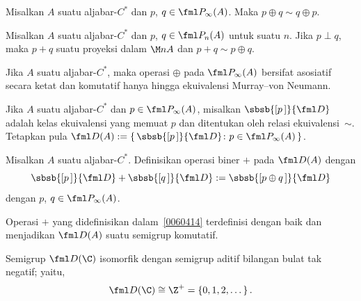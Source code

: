 \begin{prop}\label{0060331} Misalkan $A$ suatu aljabar-$C^*$ dan $p$, $q \in \fml P_\infty(A)$.
Maka $p \oplus q \sim q \oplus p$.
\end{prop}

\begin{prop}\label{0060334} Misalkan $A$ suatu aljabar-$C^*$ dan $p$, $q \in \fml P_n(A)$ untuk
suatu $n$. Jika $p \perp q$, maka $p + q$ suatu proyeksi dalam $\M nA$ dan $p + q \sim p \oplus q$.
\end{prop}

\begin{prop}\label{0060337} Jika $A$ suatu aljabar-$C^*$, maka operasi $\oplus$ pada $\fml P_\infty(A)$ bersifat
asosiatif secara ketat dan komutatif hanya hingga ekuivalensi Murray--von Neumann. %
\end{prop}

\begin{notn}\label{0060411} Jika $A$ suatu aljabar-$C^*$ dan $p \in \fml P_\infty(A)$, misalkan
$\sbsb{[p\,]}{\fml D}$ adalah kelas ekuivalensi yang memuat $p$ dan ditentukan oleh
relasi ekuivalensi~$\sim$. Tetapkan pula
$\fml D(A) := \{\,\sbsb{[p\,]}{\fml D}\colon p \in \fml P_\infty(A)\,\}$.
\end{notn}

\begin{defn}\label{0060414} Misalkan $A$ suatu aljabar-$C^*$. Definisikan operasi biner $+$ pada
$\fml D(A)$ dengan
   \[ \sbsb{[p\,]}{\fml D} + \sbsb{[q\,]}{\fml D} := \sbsb{[p \oplus q\,]}{\fml D} \]
dengan $p$, $q \in \fml P_\infty(A)$.
\end{defn}

\begin{prop}\label{0060417} Operasi $+$ yang didefinisikan dalam~\ref{0060414} terdefinisi dengan baik
dan menjadikan $\fml D(A)$ suatu semigrup komutatif.
\end{prop}

\begin{exam}\label{0060421} Semigrup $\fml D(\C)$ isomorfik dengan semigrup aditif bilangan bulat tak negatif; yaitu, %
    \[ \fml D(\C) \cong \Z^+ = \{0,1,2,\dots\}\,.  \]
\end{exam}

